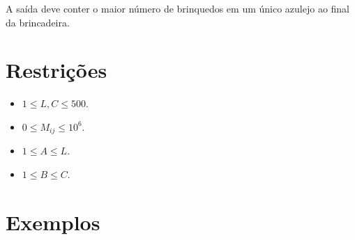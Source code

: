 A saída deve conter o maior número de brinquedos em um único azulejo ao final da brincadeira.


\section*{Restrições}

\begin{itemize}
\item $1 \leq L, C \leq 500$.
\item $0 \leq M_{ij} \leq 10^6$.
\item $1 \leq A \leq L$.
\item $1 \leq B \leq C$.
\end{itemize}


\section*{Exemplos}

\exemplo

